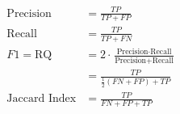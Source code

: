 \begin{subequations}
    \begin{align}
        \text{Precision}     & = \frac{TP}{TP + FP} \label{eq:precision}                                               \\
        \text{Recall}        & = \frac{TP}{TP + FN} \label{eq:recall}                                                  \\
        F1 = \text{RQ}       & = 2 \cdot \frac{\text{Precision} \cdot \text{Recall}}{\text{Precision} + \text{Recall}} \\ 
                             & = \frac{TP}{\frac{1}{2} (FN + FP) + TP} \label{eq:f1}                                   \\
        \text{Jaccard Index} & = \frac{TP}{FN + FP + TP} \label{eq:jaccard}
    \end{align}
\end{subequations}
